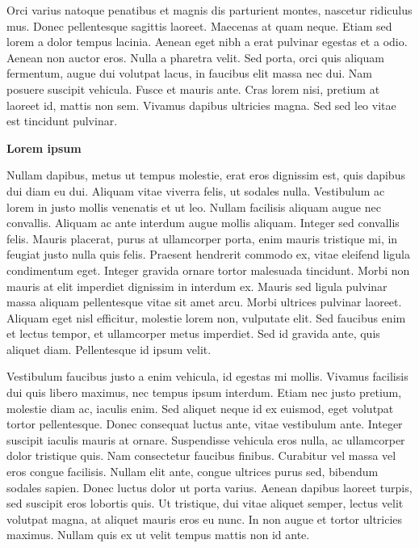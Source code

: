 \documentclass[
]{book}
\begin{document}
Orci varius natoque penatibus et magnis dis parturient montes, nascetur ridiculus mus. Donec pellentesque sagittis laoreet. Maecenas at quam neque. Etiam sed lorem a dolor tempus lacinia. Aenean eget nibh a erat pulvinar egestas et a odio. Aenean non auctor eros. Nulla a pharetra velit. Sed porta, orci quis aliquam fermentum, augue dui volutpat lacus, in faucibus elit massa nec dui. Nam posuere suscipit vehicula. Fusce et mauris ante. Cras lorem nisi, pretium at laoreet id, mattis non sem. Vivamus dapibus ultricies magna. Sed sed leo vitae est tincidunt pulvinar.

\textbf{Lorem ipsum}

Nullam dapibus, metus ut tempus molestie, erat eros dignissim est, quis dapibus dui diam eu dui. Aliquam vitae viverra felis, ut sodales nulla. Vestibulum ac lorem in justo mollis venenatis et ut leo. Nullam facilisis aliquam augue nec convallis. Aliquam ac ante interdum augue mollis aliquam. Integer sed convallis felis. Mauris placerat, purus at ullamcorper porta, enim mauris tristique mi, in feugiat justo nulla quis felis. Praesent hendrerit commodo ex, vitae eleifend ligula condimentum eget. Integer gravida ornare tortor malesuada tincidunt. Morbi non mauris at elit imperdiet dignissim in interdum ex. Mauris sed ligula pulvinar massa aliquam pellentesque vitae sit amet arcu. Morbi ultrices pulvinar laoreet. Aliquam eget nisl efficitur, molestie lorem non, vulputate elit. Sed faucibus enim et lectus tempor, et ullamcorper metus imperdiet. Sed id gravida ante, quis aliquet diam. Pellentesque id ipsum velit.

Vestibulum faucibus justo a enim vehicula, id egestas mi mollis. Vivamus facilisis dui quis libero maximus, nec tempus ipsum interdum. Etiam nec justo pretium, molestie diam ac, iaculis enim. Sed aliquet neque id ex euismod, eget volutpat tortor pellentesque. Donec consequat luctus ante, vitae vestibulum ante. Integer suscipit iaculis mauris at ornare. Suspendisse vehicula eros nulla, ac ullamcorper dolor tristique quis. Nam consectetur faucibus finibus. Curabitur vel massa vel eros congue facilisis. Nullam elit ante, congue ultrices purus sed, bibendum sodales sapien. Donec luctus dolor ut porta varius. Aenean dapibus laoreet turpis, sed suscipit eros lobortis quis. Ut tristique, dui vitae aliquet semper, lectus velit volutpat magna, at aliquet mauris eros eu nunc. In non augue et tortor ultricies maximus. Nullam quis ex ut velit tempus mattis non id ante.
\end{document}
